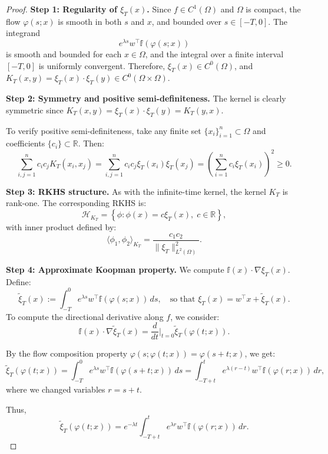 \documentclass[11pt]{article}
\theoremstyle{plain}
\def\[{\begin{equation}}
\def\]{\end{equation}}
\begin{document}
\begin{proof}
\textbf{Step 1: Regularity of \( \xi_T(x) \).}  
Since \( f \in C^1(\Omega) \) and \( \Omega \) is compact, the flow \( \varphi(s; x) \) is smooth in both \( s \) and \( x \), and bounded over \( s \in [-T, 0] \). The integrand
\[
e^{\lambda s} w^\top {\mathbb f}(\varphi(s; x))
\]
is smooth and bounded for each \( x \in \Omega \), and the integral over a finite interval \( [-T, 0] \) is uniformly convergent. Therefore, \( \xi_T(x) \in C^0(\Omega) \), and \( K_T(x, y) = \xi_T(x) \cdot \xi_T(y) \in C^0(\Omega \times \Omega) \).

\medskip

\textbf{Step 2: Symmetry and positive semi-definiteness.}  
The kernel is clearly symmetric since \( K_T(x, y) = \xi_T(x) \cdot \xi_T(y) = K_T(y, x) \).  

To verify positive semi-definiteness, take any finite set \( \{x_i\}_{i=1}^n \subset \Omega \) and coefficients \( \{c_i\} \subset \mathbb{R} \). Then:
\[
\sum_{i,j=1}^n c_i c_j K_T(x_i, x_j)
= \sum_{i,j=1}^n c_i c_j \xi_T(x_i) \xi_T(x_j)
= \left( \sum_{i=1}^n c_i \xi_T(x_i) \right)^2 \ge 0.
\]

\medskip

\textbf{Step 3: RKHS structure.}  
As with the infinite-time kernel, the kernel \( K_T \) is rank-one. The corresponding RKHS is:
\[
\mathcal{H}_{K_T} = \left\{ \phi : \phi(x) = c \xi_T(x), \; c \in \mathbb{R} \right\},
\]
with inner product defined by:
\[
\langle \phi_1, \phi_2 \rangle_{K_T} = \frac{c_1 c_2}{\| \xi_T \|^2_{L^2(\Omega)}}.
\]

\medskip

\textbf{Step 4: Approximate Koopman property.}  
We compute \( {\mathbb f}(x) \cdot \nabla \xi_T(x) \). Define:
\[
\tilde{\xi}_T(x) := \int_{-T}^0 e^{\lambda s} w^\top {\mathbb f}(\varphi(s; x)) \, ds,
\quad \text{so that } \xi_T(x) = w^\top x + \tilde{\xi}_T(x).
\]
To compute the directional derivative along \( f \), we consider:
\[
{\mathbb f}(x) \cdot \nabla \tilde{\xi}_T(x) = \frac{d}{dt} \bigg|_{t=0} \tilde{\xi}_T(\varphi(t; x)).
\]

By the flow composition property \( \varphi(s; \varphi(t; x)) = \varphi(s + t; x) \), we get:
\[
\tilde{\xi}_T(\varphi(t; x)) = \int_{-T}^0 e^{\lambda s} w^\top {\mathbb f}(\varphi(s + t; x)) \, ds
= \int_{-T + t}^{t} e^{\lambda (r - t)} w^\top {\mathbb f}(\varphi(r; x)) \, dr,
\]
where we changed variables \( r = s + t \).

Thus,
\[
\tilde{\xi}_T(\varphi(t; x)) = e^{-\lambda t} \int_{-T + t}^{t} e^{\lambda r} w^\top {\mathbb f}(\varphi(r; x)) \, dr.
\]


\end{proof}
\end{document}
